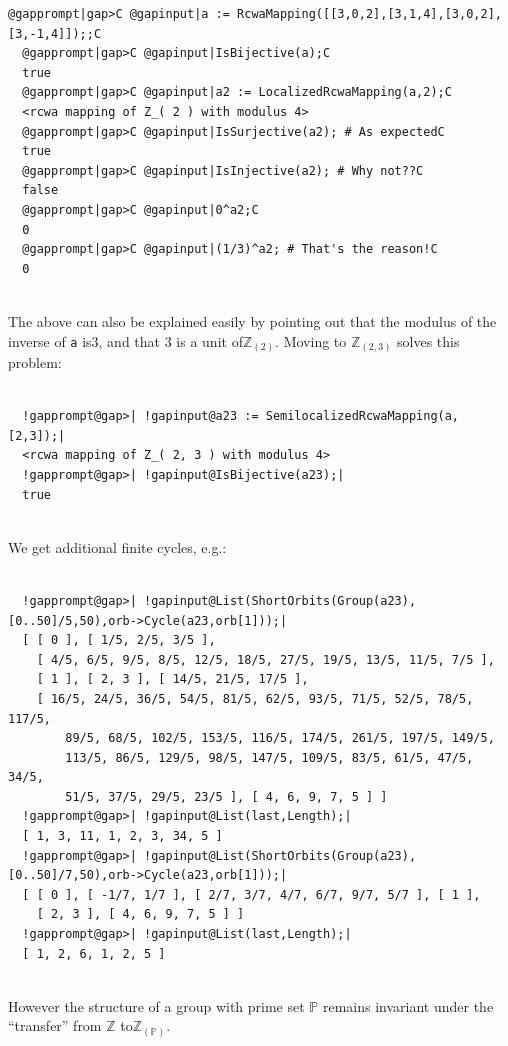 \documentclass[a4paper,11pt]{report}
\begin{document}
{{\begin{Verbatim}[commandchars=@|C,fontsize=\small,frame=single,label=Example]
  @gapprompt|gap>C @gapinput|a := RcwaMapping([[3,0,2],[3,1,4],[3,0,2],[3,-1,4]]);;C
  @gapprompt|gap>C @gapinput|IsBijective(a);C
  true
  @gapprompt|gap>C @gapinput|a2 := LocalizedRcwaMapping(a,2);C
  <rcwa mapping of Z_( 2 ) with modulus 4>
  @gapprompt|gap>C @gapinput|IsSurjective(a2); # As expectedC
  true
  @gapprompt|gap>C @gapinput|IsInjective(a2); # Why not??C
  false
  @gapprompt|gap>C @gapinput|0^a2;C
  0
  @gapprompt|gap>C @gapinput|(1/3)^a2; # That's the reason!C
  0
  
\end{Verbatim}
 The above can also be explained easily by pointing out that the modulus of the
inverse of \texttt{a} is{\nobreakspace}3, and that 3 is a unit of{\nobreakspace}${\ensuremath{\mathbb Z}}_{(2)}$. Moving to ${\ensuremath{\mathbb Z}}_{(2,3)}$ solves this problem: 
\begin{Verbatim}[commandchars=!@|,fontsize=\small,frame=single,label=Example]
  
  !gapprompt@gap>| !gapinput@a23 := SemilocalizedRcwaMapping(a,[2,3]);|
  <rcwa mapping of Z_( 2, 3 ) with modulus 4>
  !gapprompt@gap>| !gapinput@IsBijective(a23);|
  true
  
\end{Verbatim}
 We get additional finite cycles, e.g.: 
\begin{Verbatim}[commandchars=!@|,fontsize=\small,frame=single,label=Example]
  
  !gapprompt@gap>| !gapinput@List(ShortOrbits(Group(a23),[0..50]/5,50),orb->Cycle(a23,orb[1]));|
  [ [ 0 ], [ 1/5, 2/5, 3/5 ], 
    [ 4/5, 6/5, 9/5, 8/5, 12/5, 18/5, 27/5, 19/5, 13/5, 11/5, 7/5 ], 
    [ 1 ], [ 2, 3 ], [ 14/5, 21/5, 17/5 ], 
    [ 16/5, 24/5, 36/5, 54/5, 81/5, 62/5, 93/5, 71/5, 52/5, 78/5, 117/5, 
        89/5, 68/5, 102/5, 153/5, 116/5, 174/5, 261/5, 197/5, 149/5, 
        113/5, 86/5, 129/5, 98/5, 147/5, 109/5, 83/5, 61/5, 47/5, 34/5, 
        51/5, 37/5, 29/5, 23/5 ], [ 4, 6, 9, 7, 5 ] ]
  !gapprompt@gap>| !gapinput@List(last,Length);|
  [ 1, 3, 11, 1, 2, 3, 34, 5 ]
  !gapprompt@gap>| !gapinput@List(ShortOrbits(Group(a23),[0..50]/7,50),orb->Cycle(a23,orb[1]));|
  [ [ 0 ], [ -1/7, 1/7 ], [ 2/7, 3/7, 4/7, 6/7, 9/7, 5/7 ], [ 1 ], 
    [ 2, 3 ], [ 4, 6, 9, 7, 5 ] ]
  !gapprompt@gap>| !gapinput@List(last,Length);|
  [ 1, 2, 6, 1, 2, 5 ]
  
\end{Verbatim}
 However the structure of a group with prime set $\mathbb{P}$ remains invariant under the ``transfer'' from {\ensuremath{\mathbb Z}} to{\nobreakspace}${\ensuremath{\mathbb Z}}_{(\mathbb{P})}$. 

}}
\end{document}

